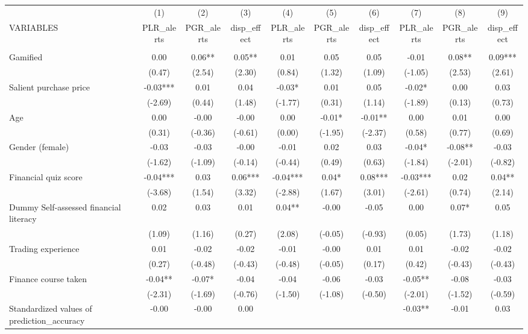 \documentclass[]{article}
\begin{document}
\begin{tabular}{lccccccccc} \hline
 & (1) & (2) & (3) & (4) & (5) & (6) & (7) & (8) & (9) \\
VARIABLES & PLR\_alerts & PGR\_alerts & disp\_effect & PLR\_alerts & PGR\_alerts & disp\_effect & PLR\_alerts & PGR\_alerts & disp\_effect \\ \hline
 &  &  &  &  &  &  &  &  &  \\
Gamified & 0.00 & 0.06** & 0.05** & 0.01 & 0.05 & 0.05 & -0.01 & 0.08** & 0.09*** \\
 & (0.47) & (2.54) & (2.30) & (0.84) & (1.32) & (1.09) & (-1.05) & (2.53) & (2.61) \\
Salient purchase price & -0.03*** & 0.01 & 0.04 & -0.03* & 0.01 & 0.05 & -0.02* & 0.00 & 0.03 \\
 & (-2.69) & (0.44) & (1.48) & (-1.77) & (0.31) & (1.14) & (-1.89) & (0.13) & (0.73) \\
Age & 0.00 & -0.00 & -0.00 & 0.00 & -0.01* & -0.01** & 0.00 & 0.01 & 0.00 \\
 & (0.31) & (-0.36) & (-0.61) & (0.00) & (-1.95) & (-2.37) & (0.58) & (0.77) & (0.69) \\
Gender (female) & -0.03 & -0.03 & -0.00 & -0.01 & 0.02 & 0.03 & -0.04* & -0.08** & -0.03 \\
 & (-1.62) & (-1.09) & (-0.14) & (-0.44) & (0.49) & (0.63) & (-1.84) & (-2.01) & (-0.82) \\
Financial quiz score & -0.04*** & 0.03 & 0.06*** & -0.04*** & 0.04* & 0.08*** & -0.03*** & 0.02 & 0.04** \\
 & (-3.68) & (1.54) & (3.32) & (-2.88) & (1.67) & (3.01) & (-2.61) & (0.74) & (2.14) \\
Dummy Self-assessed financial literacy & 0.02 & 0.03 & 0.01 & 0.04** & -0.00 & -0.05 & 0.00 & 0.07* & 0.05 \\
 & (1.09) & (1.16) & (0.27) & (2.08) & (-0.05) & (-0.93) & (0.05) & (1.73) & (1.18) \\
Trading experience & 0.01 & -0.02 & -0.02 & -0.01 & -0.00 & 0.01 & 0.01 & -0.02 & -0.02 \\
 & (0.27) & (-0.48) & (-0.43) & (-0.48) & (-0.05) & (0.17) & (0.42) & (-0.43) & (-0.43) \\
Finance course taken & -0.04** & -0.07* & -0.04 & -0.04 & -0.06 & -0.03 & -0.05** & -0.08 & -0.03 \\
 & (-2.31) & (-1.69) & (-0.76) & (-1.50) & (-1.08) & (-0.50) & (-2.01) & (-1.52) & (-0.59) \\
Standardized values of prediction\_accuracy & -0.00 & -0.00 & 0.00 &  &  &  & -0.03** & -0.01 & 0.03 \\

\end{tabular}
\end{document}
